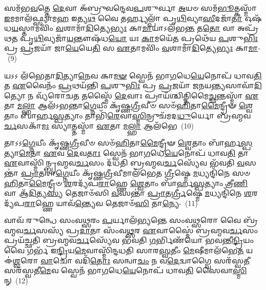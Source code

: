 𑌸𑌮᳴𑌭\-\ul{𑌵}\-𑌤𑍍𑌤𑍇 \ul{𑌦𑍇}\-𑌵𑌾 𑌅᳴𑌬𑍍𑌰𑍁𑌵𑌨𑍍𑌦𑍇𑌵\-\ul{𑌪}\-𑌶𑍁𑌰𑍍𑌵𑌾 \ul{𑌅}\-𑌯𑍞 𑌸𑌮᳴\-\ul{𑌭𑍂}\-𑌤𑍍𑌕𑌸𑍍𑌮𑌾᳴ \ul{𑌇}\-𑌮𑌮𑌾𑌲᳴𑌫𑍍𑌸𑍍𑌯𑌾𑌮\-\ul{𑌹} 𑌇𑌤𑍍𑌯\-\ul{𑌥} 𑌵𑍈 𑌤𑌰𑍍𑌹𑍍𑌯𑌲𑍍𑌪𑌾᳴ 𑌪𑍃\-\ul{𑌥𑌿}\-𑌵𑍍𑌯𑌾\-\ul{𑌸𑍀}\-𑌦𑌜𑌾᳴\-\ul{𑌤𑌾} 𑌓𑌷᳴𑌧\-\ul{𑌯}\-𑌸𑍍𑌤𑌾𑌮𑌵𑌿𑌂᳴ \ul{𑌵}\-𑌶𑌾𑌮𑌾᳴\-\ul{𑌦𑌿}\-𑌤𑍍𑌯𑍇\-\ul{𑌭𑍍𑌯𑌃} 𑌕𑌾\-\ul{𑌮𑌾}\-𑌯𑌾\-𑌽𑌲᳴𑌭\-\ul{𑌨𑍍𑌤} 𑌤\-\ul{𑌤𑍋} 𑌵𑌾 𑌅𑌪𑍍𑌰᳴𑌥𑌤 𑌪𑍃\-\ul{𑌥𑌿}\-𑌵𑍍𑌯𑌜𑌾᳴\-\ul{𑌯}\-𑌨𑍍𑌤𑍗𑌷᳴𑌧\-\ul{𑌯𑍋} 𑌯𑌃 \ul{𑌕𑌾}\-𑌮𑌯𑍇᳴\-\ul{𑌤} 𑌪𑍍𑌰𑌥𑍇᳴𑌯 \ul{𑌪}\-𑌶𑍁\-\ul{𑌭𑌿𑌃} 𑌪𑍍𑌰 \ul{𑌪𑍍𑌰}\-𑌜𑌯𑌾᳴ 𑌜𑌾\-\ul{𑌯𑍇}\-𑌯𑍇\-\ul{𑌤𑌿} 𑌸 \ul{𑌏}\-𑌤𑌾𑌮𑌵𑌿𑌂᳴ \ul{𑌵}\-𑌶𑌾𑌮𑌾᳴\-\ul{𑌦𑌿}\-𑌤𑍍𑌯𑍇\-\ul{𑌭𑍍𑌯𑌃} 𑌕𑌾\-\ul{𑌮𑌾}\--~(9)

𑌯𑌽𑌽 𑌲᳴𑌭𑍇𑌤𑌾\-\ul{𑌦𑌿}\-𑌤𑍍𑌯𑌾\-\ul{𑌨𑍇}\-𑌵 𑌕𑌾\-\ul{𑌮}\-\-\ul{𑍟} 𑌸𑍍𑌵𑍇𑌨᳴ 𑌭𑌾\-\ul{𑌗}\-𑌧𑍇\-\ul{𑌯𑍇}\-𑌨𑍋𑌪᳴ 𑌧𑌾𑌵\-\ul{𑌤𑌿} 𑌤 \ul{𑌏}\-𑌵𑍈𑌨𑌂᳴ \ul{𑌪𑍍𑌰}\-𑌥𑌯᳴𑌨𑍍𑌤𑌿 \ul{𑌪}\-𑌶𑍁\-\ul{𑌭𑌿𑌃} 𑌪𑍍𑌰 \ul{𑌪𑍍𑌰}\-𑌜𑌯𑌾᳴ 𑌜𑌨𑌯\-\ul{𑌨𑍍𑌤𑍍𑌯}\-𑌸𑌾𑌵𑌾᳴\-\ul{𑌦𑌿}\-𑌤𑍍𑌯𑍋 𑌨 𑌵𑍍𑌯᳴𑌰𑍋𑌚\-\ul{𑌤} 𑌤𑌸𑍍𑌮𑍈᳴ \ul{𑌦𑍇}\-𑌵𑌾𑌃 𑌪𑍍𑌰𑌾𑌯᳴𑌶𑍍𑌚𑌿𑌤𑍍𑌤𑌿𑌮𑍈\-\ul{𑌚𑍍𑌛}\-𑌨𑍍𑌤𑌸𑍍𑌮𑌾᳴ \ul{𑌏}\-𑌤𑌾 \ul{𑌮}\-\-\ul{𑌲𑍍}\-\mbox{}𑌹𑌾 𑌆𑌲᳴\-𑌽𑌭𑌨𑍍𑌤𑌾\-\ul{𑌗𑍍𑌨𑍇}\-𑌯𑍀𑌂 𑌕𑍃᳴𑌷𑍍𑌣\-\ul{𑌗𑍍𑌰𑍀}\-𑌵𑍀𑍞 𑌸𑍞᳴\-\ul{𑌹𑌿}\-𑌤𑌾\-\ul{𑌮𑍈}\-𑌨𑍍𑌦𑍍𑌰𑍀𑍟 \ul{𑌶𑍍𑌵𑍇}\-𑌤𑌾𑌂 𑌬𑌾᳴𑌰𑍍\mbox{}𑌹\-\ul{𑌸𑍍𑌪}\-𑌤𑍍𑌯𑌾𑌂 𑌤𑌾𑌭𑌿᳴\-\ul{𑌰𑍇}\-𑌵𑌾\-\ul{𑌸𑍍𑌮𑌿}\-𑌨𑍍𑌰𑍁𑌚᳴𑌮𑌦\-\ul{𑌧𑍁}\-𑌰𑍍𑌯𑍋 𑌬𑍍𑌰᳴𑌹𑍍𑌮𑌵\-\ul{𑌰𑍍𑌚}\-𑌸𑌕𑌾᳴\-\ul{𑌮𑌃} 𑌸𑍍𑌯𑌾𑌤𑍍𑌤𑌸𑍍𑌮𑌾᳴ \ul{𑌏}\-𑌤𑌾 \ul{𑌮}\-\-\ul{𑌲𑍍}\-\mbox{}𑌹𑌾 𑌆𑌲᳴𑌭𑍇\-~(10)

𑌤𑌾𑌽𑌽\-\ul{𑌗𑍍𑌨𑍇}\-𑌯𑍀𑌂 𑌕𑍃᳴𑌷𑍍𑌣\-\ul{𑌗𑍍𑌰𑍀}\-𑌵𑍀𑍞 𑌸𑍞᳴\-\ul{𑌹𑌿}\-𑌤𑌾\-\ul{𑌮𑍈}\-𑌨𑍍𑌦𑍍𑌰𑍀𑍟 \ul{𑌶𑍍𑌵𑍇}\-𑌤𑌾𑌂 𑌬𑌾᳴𑌰𑍍\mbox{}𑌹\-\ul{𑌸𑍍𑌪}\-𑌤𑍍𑌯𑌾\-\ul{𑌮𑍇}\-𑌤𑌾 \ul{𑌏}\-𑌵 \ul{𑌦𑍇}\-𑌵\-\ul{𑌤𑌾𑌃} 𑌸𑍍𑌵𑍇𑌨᳴ 𑌭𑌾\-\ul{𑌗}\-𑌧𑍇\-\ul{𑌯𑍇}\-𑌨𑍋𑌪᳴ 𑌧𑌾𑌵\-\ul{𑌤𑌿} 𑌤𑌾 \ul{𑌏}\-𑌵𑌾𑌸𑍍𑌮𑌿᳴𑌨𑍍𑌬𑍍𑌰𑌹𑍍𑌮𑌵\-\ul{𑌰𑍍𑌚}\-𑌸𑌂 𑌦᳴𑌧𑌤𑌿 𑌬𑍍𑌰𑌹𑍍𑌮𑌵\-\ul{𑌰𑍍𑌚}\-𑌸𑍍𑌯𑍇᳴𑌵 𑌭᳴𑌵𑌤𑌿 \ul{𑌵}\-𑌸𑌨𑍍𑌤𑌾॑ \ul{𑌪𑍍𑌰𑌾}\-𑌤𑌰𑌾॑\-\ul{𑌗𑍍𑌨𑍇}\-𑌯𑍀𑌂 𑌕𑍃᳴𑌷𑍍𑌣\-\ul{𑌗𑍍𑌰𑍀}\-𑌵𑍀𑌮𑌾𑌲᳴𑌭𑍇𑌤 \ul{𑌗𑍍𑌰𑍀}\-𑌷𑍍𑌮𑍇 \ul{𑌮}\-𑌧𑍍𑌯𑌨𑍍𑌦𑌿᳴𑌨𑍇 𑌸𑍞\-\ul{𑌹𑌿}\-𑌤𑌾\-\ul{𑌮𑍈}\-𑌨𑍍𑌦𑍍𑌰𑍀𑍞 \ul{𑌶}\-𑌰𑌦𑍍𑌯᳴𑌪\-\ul{𑌰𑌾}\-𑌹𑍍𑌣𑍇 \ul{𑌶𑍍𑌵𑍇}\-𑌤𑌾𑌂 𑌬𑌾᳴𑌰𑍍\mbox{}𑌹\-\ul{𑌸𑍍𑌪}\-𑌤𑍍𑌯𑌾𑌂 𑌤𑍍𑌰𑍀\-\ul{𑌣𑌿} 𑌵𑌾 𑌆᳴\-\ul{𑌦𑌿}\-𑌤𑍍𑌯\-\ul{𑌸𑍍𑌯} 𑌤𑍇𑌜𑌾𑍞᳴𑌸𑌿 \ul{𑌵}\-𑌸𑌨𑍍𑌤𑌾॑ \ul{𑌪𑍍𑌰𑌾}\-𑌤\-\ul{𑌰𑍍𑌗𑍍𑌰𑍀}\-𑌷𑍍𑌮𑍇 \ul{𑌮}\-𑌧𑍍𑌯𑌨𑍍𑌦𑌿᳴𑌨𑍇 \ul{𑌶}\-𑌰𑌦𑍍𑌯᳴𑌪\-\ul{𑌰𑌾}\-𑌹𑍍𑌣𑍇 𑌯𑌾𑌵᳴\-\ul{𑌨𑍍𑌤𑍍𑌯𑍇}\-𑌵 𑌤𑍇𑌜𑌾𑍞᳴\-\ul{𑌸𑌿} 𑌤𑌾\-\ul{𑌨𑍍𑌯𑍇}\--~(11)

𑌵𑌾𑌵᳴ 𑌰𑍁𑌨𑍍𑌧𑍇 𑌸𑌂𑌵\-\ul{𑌥𑍍𑌸}\-𑌰𑌂 \ul{𑌪}\-𑌰𑍍𑌯𑌾𑌲᳴𑌭𑍍𑌯𑌨𑍍𑌤𑍇 𑌸𑌂𑌵\-\ul{𑌥𑍍𑌸}\-𑌰𑍋 𑌵𑍈 𑌬𑍍𑌰᳴𑌹𑍍𑌮𑌵\-\ul{𑌰𑍍𑌚}\-𑌸𑌸𑍍𑌯᳴ 𑌪𑍍𑌰\-\ul{𑌦𑌾}\-𑌤𑌾 𑌸𑌂᳴𑌵\-\ul{𑌥𑍍𑌸}\-𑌰 \ul{𑌏}\-𑌵𑌾𑌸𑍍𑌮𑍈॑ 𑌬𑍍𑌰𑌹𑍍𑌮𑌵\-\ul{𑌰𑍍𑌚}\-𑌸𑌂 𑌪𑍍𑌰𑌯᳴𑌚𑍍𑌛𑌤𑌿 𑌬𑍍𑌰𑌹𑍍𑌮𑌵\-\ul{𑌰𑍍𑌚}\-𑌸𑍍𑌯𑍇᳴𑌵 𑌭᳴𑌵𑌤𑌿 \ul{𑌗}\-𑌰𑍍𑌭𑌿𑌣᳴𑌯𑍋 𑌭𑌵𑌨𑍍𑌤𑍀\-\ul{𑌨𑍍𑌦𑍍𑌰𑌿}\-𑌯𑌂 𑌵𑍈 𑌗𑌰𑍍𑌭᳴ 𑌇\-\ul{𑌨𑍍𑌦𑍍𑌰𑌿}\-𑌯\-\ul{𑌮𑍇}\-𑌵𑌾𑌸𑍍𑌮𑌿᳴𑌨𑍍𑌦𑌧𑌤𑌿 𑌸𑌾𑌰\-\ul{𑌸𑍍𑌵}\-𑌤𑍀𑌂 \ul{𑌮𑍇}\-𑌷𑍀𑌮𑌾\-𑌲᳴𑌭𑍇\-\ul{𑌤} 𑌯 𑌈॑\-\ul{𑌶𑍍𑌵}\-𑌰𑍋 \ul{𑌵𑌾}\-𑌚𑍋 𑌵𑌦𑌿᳴\-\ul{𑌤𑍋𑌃} 𑌸𑌨𑍍𑌵𑌾\-\ul{𑌚𑌂} 𑌨 𑌵\-\ul{𑌦𑍇}\-𑌦𑍍𑌵𑌾𑌗𑍍𑌵𑍈 𑌸𑌰᳴𑌸𑍍𑌵\-\ul{𑌤𑍀} 𑌸𑌰᳴𑌸𑍍𑌵𑌤𑍀\-\ul{𑌮𑍇}\-𑌵 𑌸𑍍𑌵𑍇𑌨᳴ 𑌭𑌾\-\ul{𑌗}\-𑌧𑍇\-\ul{𑌯𑍇}\-𑌨𑍋𑌪᳴ 𑌧𑌾𑌵\-\ul{𑌤𑌿} 𑌸𑍈𑌵𑌾\-\ul{𑌸𑍍𑌮𑌿}\-𑌨𑍍~(12)

